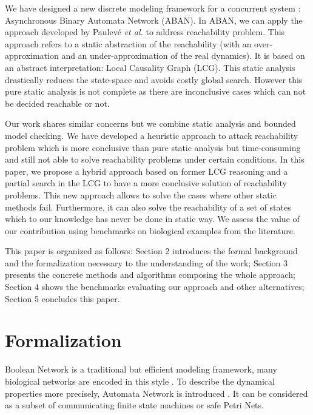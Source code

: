 \documentclass{entcs}
\begin{document}
We have designed a new discrete modeling framework for a concurrent system \cite{chai2018heuristic}: Asynchronous Binary Automata Network (ABAN). %
In ABAN, we can apply the approach developed by Paulev\'e \textit{et al.} \cite{pauleve2017reduction,folschette2015,pauleve2011} to address reachability problem.
This approach refers to a static abstraction of the reachability (with an over-approximation and an under-approximation of the real dynamics).
It is based on an abstract interpretation: Local Causality Graph (LCG). 
This static analysis drastically reduces the state-space and avoids costly global search\cite{pauleve2012}. 
However this pure static analysis is not complete as there are inconclusive cases which can not be decided reachable or not.

Our work shares similar concerns but we combine static analysis and bounded model checking.
We have developed a heuristic approach to attack reachability problem \cite{chai2018heuristic} which is more conclusive than pure static analysis but time-consuming and still not able to solve reachability problems under certain conditions.
In this paper, we propose a hybrid approach based on former LCG reasoning and a partial search in the LCG to have a more conclusive solution of reachability problems.
This new approach allows to solve the cases where other static methods fail.
Furthermore, it can also solve the reachability of a set of states which to our knowledge has never be done in static way.
We assess the value of our contribution using benchmarks on biological examples from the literature.%

This paper is organized as follows: Section 2 introduces the formal background and the formalization necessary to the understanding of the work; Section 3 presents the concrete methods and algorithms composing the whole approach; Section 4 shows the benchmarks evaluating our approach and other alternatives; Section 5 concludes this paper.

\section{Formalization}
Boolean Network is a traditional but efficient modeling framework, many biological networks are encoded in this style \cite{kauffman1969}.
To describe the dynamical properties more precisely, Automata Network is introduced \cite{chai2018heuristic,plateau1991stochastic}. 
It can be considered as a subset of communicating finite state machines or safe Petri Nets.
\end{document}
